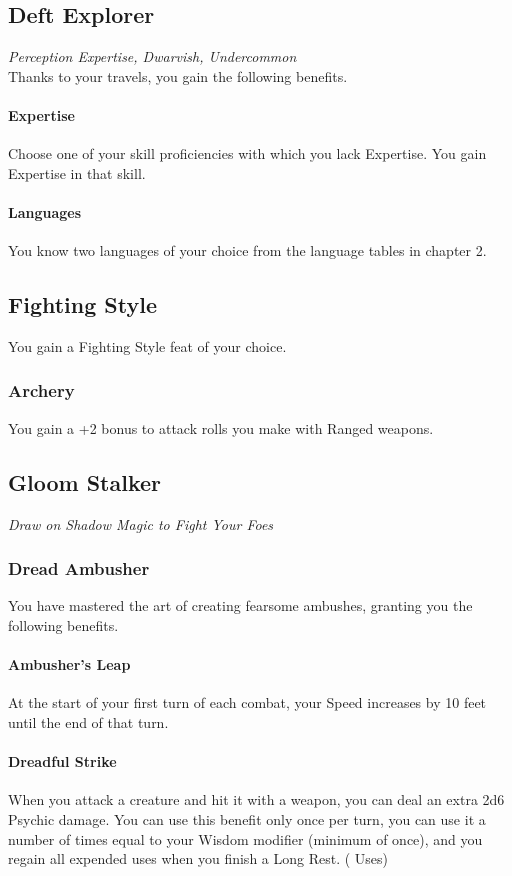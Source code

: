 \documentclass[letterpaper,openany,oneside,twocolumn]{book}
\begin{document}
\subsection*{Deft Explorer}
\textit{Perception Expertise, Dwarvish, Undercommon}\\
Thanks to your travels, you gain the following benefits.
\paragraph*{Expertise} Choose one of your skill proficiencies with which you lack Expertise. You gain Expertise in that skill.
\paragraph*{Languages} You know two languages of your choice from the language tables in chapter 2.
\subsection*{Fighting Style}
You gain a Fighting Style feat of your choice.
\subsubsection*{Archery}
You gain a +2 bonus to attack rolls you make with Ranged weapons.
\subsection*{Gloom Stalker}
\textit{Draw on Shadow Magic to Fight Your Foes}
\subsubsection*{Dread Ambusher}
You have mastered the art of creating fearsome ambushes, granting you the following benefits.
\paragraph*{Ambusher's Leap} At the start of your first turn of each combat, your Speed increases by 10 feet until the end of that turn.
\paragraph*{Dreadful Strike} When you attack a creature and hit it with a weapon, you can deal an extra 2d6 Psychic damage. You can use this benefit only once per turn, you can use it a number of times equal to your Wisdom modifier (minimum of once), and you regain all expended uses when you finish a Long Rest. ( Uses)
\end{document}
